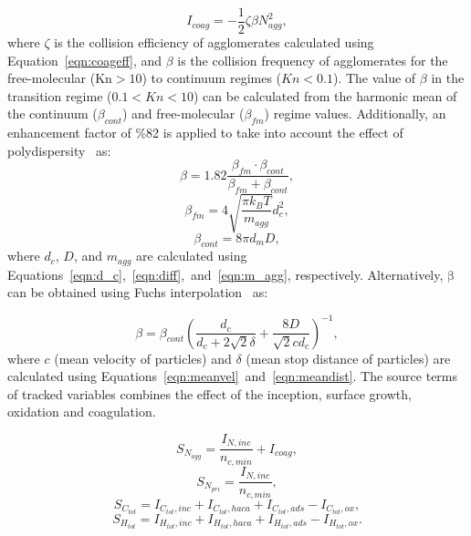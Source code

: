 \begin{equation}
	I_{coag} = -\frac{1}{2}\zeta\beta N^2_{agg}
	\label{eqn:Icoag},
\end{equation}
where $\zeta$ is the collision efficiency of agglomerates calculated using Equation~\eqref{eqn:coageff}, and ${\beta}$ is the collision frequency of agglomerates for the free-molecular ($\mathrm{Kn>10}$) to continuum regimes (${Kn<0.1}$). The value of ${\beta}$ in the transition regime (${0.1<Kn<10}$) can be calculated from the harmonic mean of the continuum (${\beta_{cont}}$) and free-molecular (${\beta_{fm}}$) regime values. Additionally, an enhancement factor of \%82 is applied to take into account the effect of polydispersity~\citep{kelesidis2021self} as:
\begin{equation}
	\beta = 1.82\frac{\beta_{fm}\cdot\beta_{cont}}{\beta_{fm}+\beta_{cont}}
	\label{eqn:betahmmono},
\end{equation}
\begin{equation}
	\beta_{fm} = 4\sqrt{\frac{\pi k_B T}{m_{agg}}} d^2_c
	\label{eqn:betafmmono},
\end{equation}
\begin{equation}
	\beta_{cont} = 8\pi d_m D,
	\label{eqn:betacontmono}
\end{equation}
\noindent where $d_c$, $D$, and $m_{agg}$ are calculated using Equations~\eqref{eqn:d_c},~\eqref{eqn:diff},~and~\eqref{eqn:m_agg}, respectively.
Alternatively, $\mathrm{\beta}$ can be obtained using Fuchs interpolation~\citep{fuchs1965mechanics} as:

\begin{equation}
	\beta = \beta_{cont}
	\left(
		\frac{d_c}{d_c+2\sqrt{2}\delta} +
		\frac{8D}{\sqrt{2}c d_c}
	\right)^{-1},
	\label{eqn:betafuchsmono}
\end{equation}
\noindent where $c$ (mean velocity of particles) and $\delta$ (mean stop distance of particles) are calculated using Equations~\eqref{eqn:meanvel}~and~\eqref{eqn:meandist}. The source terms of tracked variables combines the effect of the inception, surface growth, oxidation and coagulation.

\begin{equation}
	S_{N_{agg}} = \frac{I_{N,inc}}{n_{c,min}}+I_{coag},
	\label{eqn:S_N_agg}
\end{equation}
\begin{equation}
	S_{N_{pri}} = \frac{I_{N,inc}}{n_{c,min}},
	\label{eqn:S_N_pri}
\end{equation}
\begin{equation}
	S_{C_{tot}} = I_{C_{tot},inc}+I_{C_{tot},haca}+I_{C_{tot},ads} - I_{C_{tot},ox},
	\label{eqn:S_C_tot}
\end{equation}
\begin{equation}
	S_{H_{tot}} = I_{H_{tot},inc}+I_{H_{tot},haca}+I_{H_{tot},ads} - I_{H_{tot},ox}.
	\label{eqn:S_H_tot}
\end{equation}


